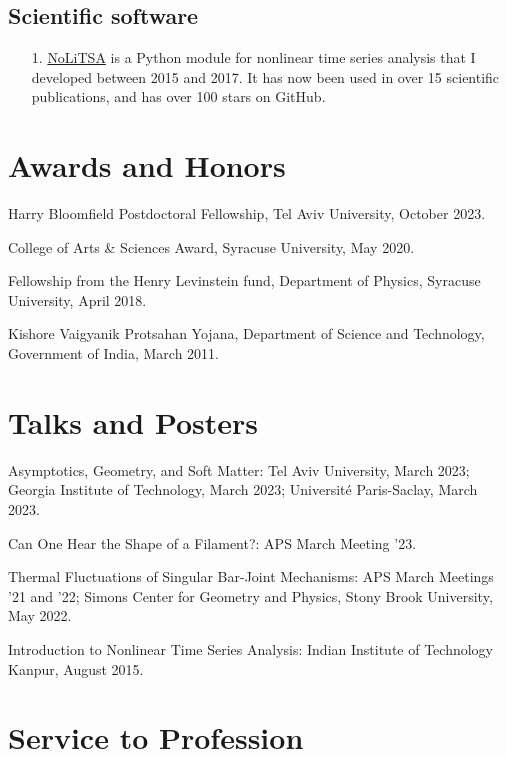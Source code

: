 \documentclass[10pt,a4paper,article,oneside]{memoir}
\def\nohangpars{%
  \leftskip=0pt%
  \parindent=0pt%
  \setsecindent{0pt}%
  \setsubsecindent{0pt}%
}
\begin{document}
\subsection{Scientific software}

\begin{enumerate}
  \item[1.] \href{https://github.com/manu-mannattil/NoLiTSA}{NoLiTSA} is a Python module for nonlinear time series analysis that I developed between 2015 and 2017.  It has now been used in over 15 scientific publications, and has over 100 stars on GitHub.
\end{enumerate}


\section{Awards and Honors}

Harry Bloomfield Postdoctoral Fellowship, Tel Aviv University, October 2023.

College of Arts \& Sciences Award, Syracuse University, May 2020.

Fellowship from the Henry Levinstein fund, Department of Physics, Syracuse University, April 2018.

Kishore Vaigyanik Protsahan Yojana, Department of Science and Technology, Government of India, March 2011.


\section{Talks and Posters}

Asymptotics, Geometry, and Soft Matter: Tel Aviv University, March 2023; Georgia Institute of Technology, March 2023; Universit\'{e} Paris-Saclay, March 2023.

Can One Hear the Shape of a Filament?: APS March Meeting '23.

Thermal Fluctuations of Singular Bar-Joint Mechanisms: APS March Meetings '21 and '22; Simons Center for Geometry and Physics, Stony Brook University, May 2022.

Introduction to Nonlinear Time Series Analysis: Indian Institute of Technology Kanpur, August 2015.


\nohangpars

\section{Service to Profession}
\end{document}
